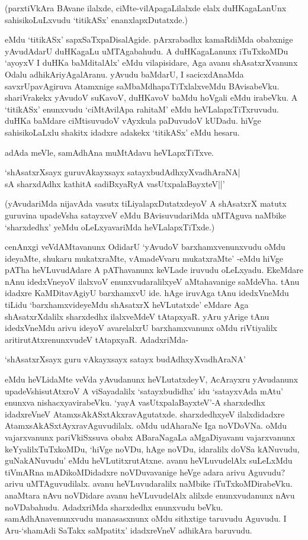 (parxtiVkAra BAvane ilalxde, ciMte-vilApagaLilalxde elalx duHKagaLanUnx sahisikoLuLxvudu `titikASx' enanxlapxDutatxde.)

eMdu `titikASx' sapxSaTxpaDisalAgide. pArxrabadhx kamaRdiMda obabxnige yAvudAdarU duHKagaLu uMTAgabahudu. A duHKagaLanunx iTuTxkoMDu `ayoyxV I duHKa baMditalAlx' eMdu vilapisidare, Aga avanu shAsatxrXvanunx Odalu adhikAriyAgalAranu. yAvudu baMdarU, I sacicxdAnaMda savxrUpavAgiruva Atamxnige saMbaMdhapaTiTxlalxveMdu BAvisabeVku. shariVrakekx yAvudoV suKavoV, duHKavoV baMdu hoVgali eMdu irabeVku. A `titikASx' enunxvudu `ciMtAvilApa rahitaM' eMdu heVLalapxTiTxruvudu. duHKa baMdare ciMtisuvudoV vAyxkula paDuvudoV kUDadu. hiVge sahisikoLaLxlu shakitx idadxre adakekx `titikASx' eMdu hesaru.

adAda meVle, samAdhAna muMtAdavu heVLapxTiTxve.

\begin{shloka}
`shAsatxrXsayx guruvAkayxsayx satayxbudAdhxyXvadhAraNA|\\
sA sharxdAdhx kathitA sadiBxyaRyA vasUtxpalaBayxteV||'
\end{shloka}

(yAvudariMda nijavAda vasutx tiLiyalapxDutatxdeyoV A shAsatxrX matutx guruvina upadeVsha satayxveV eMdu BAvisuvudariMda uMTAguva naMbike `sharxdedhx' yeMdu oLeLxyavariMda heVLalapxTiTxde.)

cenAnxgi veVdAMtavanunx OdidarU `yAvudoV barxhamxvenunxvudu oMdu ideyaMte, shukaru mukatxraMte, vAmadeVvaru mukatxraMte' -eMdu hiVge pATha heVLuvudAdare A pAThavanunx keVLade iruvudu oLeLxyadu. EkeMdare nAnu idedxVneyoV ilalxvoV enunxvudaralilxyeV aMtahavanige saMdeVha. tAnu idadxre KaMDitavAgiyU barxhamxvU ide. hAge iruvAga tAnu idedxVneMdu tiLidu `barxhamxvideyeMdu shAsatxrX heVLutatxde' eMdare Aga shAsatxrXdalilx sharxdedhx ilalxveMdeV tAtapxyaR. yAru yArige tAnu idedxVneMdu arivu ideyoV avarelalxrU barxhamxvanunx oMdu riVtiyalilx aritirutAtxrenunxvudeV tAtapxyaR. AdadxriMda-

\begin{shloka}
`shAsatxrXsayx guru vAkayxsayx satayx budAdhxyXvadhAraNA'
\end{shloka}

\noindent eMdu heVLidaMte veVda yAvudanunx heVLutatxdeyV, AcArayxru yAvudanunx upadeVshisutAtxroV A viSayadalilx `satayxbudidhx' idu `satayxvAda mAtu' enunxva nishacxyavirabeVku. `yayA vasUtxpalaBayxteV'-A sharxdedhx idadxreVneV AtamxsAkASxtAkxravAgutatxde. sharxdedhxyeV ilalxdidadxre AtamxsAkASxtAyxravAguvudilalx. oMdu udAharaNe Iga noVDoVNa. oMdu vajarxvanunx pariVkiSxsuva obabx ABaraNagaLa aMgaDiyavanu vajarxvanunx keYyalilxTuTxkoMDu, `hiVge noVDu, hAge noVDu, idaralilx doVSa kANuvudu, guNakANuvudu' eMdu heVLutitxrutAtxne. avanu heVLuvudelAlx suLeLxMdu tiVmARna mADikoMDidadxre noVDuvavanige heVge adara arivu Aguvudu? arivu uMTAguvudilalx. avanu heVLuvudaralilx naMbike iTuTxkoMDirabeVku. anaMtara nAvu noVDidare avanu heVLuvudelAlx alilxde enunxvudanunx nAvu noVDabahudu. AdadxriMda sharxdedhx enunxvudu beVku. samAdhAnavenunxvudu manasasxnunx oMdu sithxtige taruvudu Aguvudu. I Aru-`shamAdi SaTakx saMpatitx' idadxreVneV adhikAra baruvudu.

